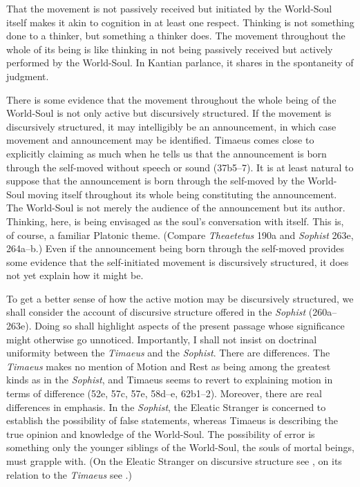 That the movement is not passively received but initiated by the World-Soul itself makes it akin to cognition in at least one respect. Thinking is not something done to a thinker, but something a thinker does. The movement throughout the whole of its being is like thinking in not being passively received but actively performed by the World-Soul. In Kantian parlance, it shares in the spontaneity of judgment.

There is some evidence that the movement throughout the whole being of the World-Soul is not only active but discursively structured. If the movement is discursively structured, it may intelligibly be an announcement, in which case movement and announcement may be identified. Timaeus comes close to explicitly claiming as much when he tells us that the announcement is born through the self-moved without speech or sound (37b5--7). It is at least natural to suppose that the announcement is born through the self-moved by the World-Soul moving itself throughout its whole being constituting the announcement. The World-Soul is not merely the audience of the announcement but its author. Thinking, here, is being envisaged as the soul's conversation with itself. This is, of course, a familiar Platonic theme. (Compare \emph{Theaetetus} 190a and \emph{Sophist} 263e, 264a--b.) Even if the announcement being born through the self-moved provides some evidence that the self-initiated movement is discursively structured, it does not yet explain how it might be.

To get a better sense of how the active motion may be discursively structured, we shall consider the account of discursive structure offered in the \emph{Sophist} (260a--263e). Doing so shall highlight aspects of the present passage whose significance might otherwise go unnoticed. Importantly, I shall not insist on doctrinal uniformity between the \emph{Timaeus} and the \emph{Sophist}. There are differences. The \emph{Timaeus} makes no mention of Motion and Rest as being among the greatest kinds as in the \emph{Sophist}, and Timaeus seems to revert to explaining motion in terms of difference (52e, 57c, 57e, 58d--e, 62b1--2). Moreover, there are real differences in emphasis. In the \emph{Sophist}, the Eleatic Stranger is concerned to establish the possibility of false statements, whereas Timaeus is describing the true opinion and knowledge of the World-Soul. The possibility of error is something only the younger siblings of the World-Soul, the souls of mortal beings, must grapple with. (On the Eleatic Stranger on discursive structure see \citealt[]{Frede:1992ec}, on its relation to the \emph{Timaeus} see \citealt[]{Betegh:2019fq}.)

